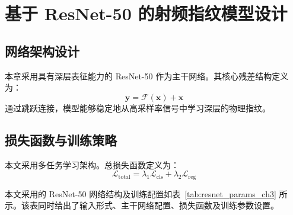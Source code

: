 \section{基于 ResNet-50 的射频指纹模型设计}

\subsection{网络架构设计}

本章采用具有深层表征能力的 ResNet-50 作为主干网络。其核心残差结构定义为：
\begin{equation}
\mathbf{y} = \mathcal{F}(\mathbf{x}) + \mathbf{x}
\end{equation}
通过跳跃连接，模型能够稳定地从高采样率信号中学习深层的物理指纹。

\subsection{损失函数与训练策略}

本文采用多任务学习架构。总损失函数定义为：
\begin{equation}
\mathcal{L}_{\mathrm{total}} = \lambda_1 \mathcal{L}_{\mathrm{cls}} + \lambda_2 \mathcal{L}_{\mathrm{reg}}
\end{equation}

本文采用的 ResNet-50 网络结构及训练配置如表~\ref{tab:resnet_params_ch3} 所示。该表同时给出了输入形式、主干网络配置、损失函数及训练参数设置。

